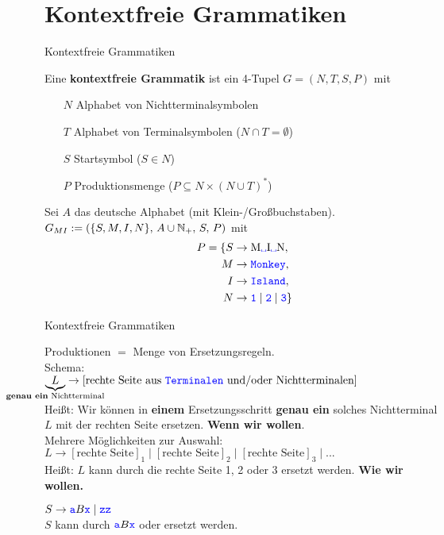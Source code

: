 \section{Kontextfreie Grammatiken}
\begin{frame}{Kontextfreie Grammatiken}
	
	\begin{Definition}
		Eine \textbf{kontextfreie Grammatik} ist ein 4-Tupel $G = (N, T, S ,P)$ mit
		\begin{itemize}
			\item[$N$] Alphabet von Nichtterminalsymbolen
			\item[$T$] Alphabet von Terminalsymbolen ($N \cap T = \emptyset$)
			\item[$S$] Startsymbol ($S \in N$)
			\item[$P$] Produktionsmenge ($P \subseteq N \times (N \cup T)^\ast$)
		\end{itemize}
	\end{Definition}

	\pause
	\begin{Beispiel}
		Sei $A$ das deutsche Alphabet (mit Klein-/Großbuchstaben).\\
		$G_{MI} := \left(\{S, M, I, N\}, \, A \cup \mathbb{N}_+, \, S, \, P\right)$ mit
		\begin{align*}
			P = \{S &\to \text{M\word\sp I\word\sp N}, \\
			M &\to \word{Monkey}, \\
			I &\to \word{Island}, \\
			N &\to \word 1 \mid \word 2 \mid \word 3 \}
		\end{align*}
	\end{Beispiel}
\end{frame}

\begin{frame}{Kontextfreie Grammatiken}
	\begin{block}{Produktionen}
		$=$ Menge von Ersetzungsregeln. \\
		Schema: \\
		\qqquad $\underbrace{L}_{\mathclap{\text{\textbf{genau ein} Nichtterminal}}} \to [\text{rechte Seite aus \word{Terminalen} und/oder Nichtterminalen}]$ \\
		\smallskip
		Heißt: Wir können in \textbf{einem} Ersetzungsschritt \textbf{genau ein} solches Nichtterminal $L$ mit der rechten Seite ersetzen. \textbf{Wenn wir wollen}. \\
		\medskip
		\pause
		Mehrere Möglichkeiten zur Auswahl: \\
		\qquad $L \to [\text{rechte Seite}]_1 \mid [\text{rechte Seite}]_2 \mid [\text{rechte Seite}]_3 \mid ...$ \\
		Heißt: $L$ kann durch die rechte Seite 1, 2 oder 3 ersetzt werden. \textbf{Wie wir wollen.} \\
		\pause
		\begin{Beispiel}
			$S \to \hbox{\textcolor{blue}{\texttt{a}}}B\hbox{\textcolor{blue}{\texttt{x}}} \mid \hbox{\textcolor{blue}{\texttt{zz}}}$ \\
			\impl $S$ kann durch $\hbox{\textcolor{blue}{\texttt{a}}}B\hbox{\textcolor{blue}{\texttt{x}}}$ oder  ersetzt werden.
		\end{Beispiel}
	\end{block}
\end{frame}

